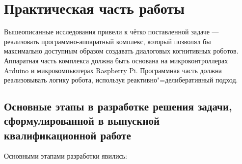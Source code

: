 \chapter{Практическая часть работы}

Вышеописанные исследования привели к чётко поставленной задаче --- реализовать программно-аппаратный комплекс, который позволял бы максимально доступным образом создавать диалоговых когнитивных роботов. Аппаратная часть комплекса должна быть основана на микроконтроллерах Arduino и микрокомпьютерах Raspberry Pi. Программная часть должна реализовывать логику робота, используя реактивно"=делиберативный подход.

\section{Основные этапы в разработке решения задачи, сформулированной в выпускной квалификационной работе}
Основными этапами разработки явились:
